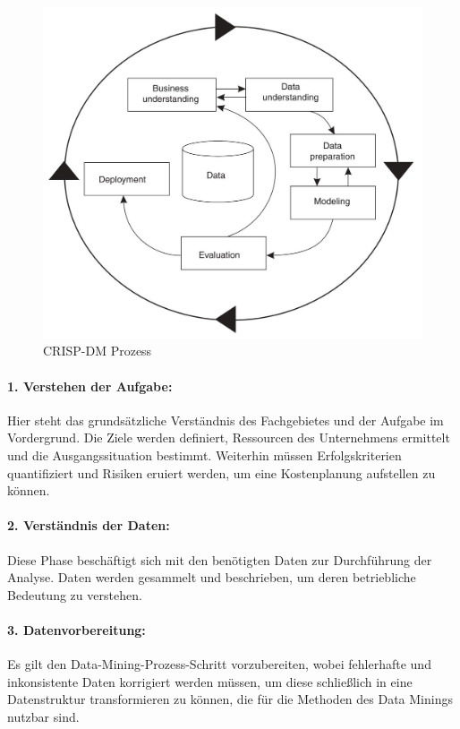 \begin{figure}[H]
\centering
\includegraphics[scale=0.7]{se-wa-jpg/crisp}
\caption[CRISP-DM Prozess]{CRISP-DM Prozess\protect\footnotemark}
\label{crisp}
\end{figure}


\paragraph{1. Verstehen der Aufgabe:}
Hier steht das grundsätzliche Verständnis des Fachgebietes und der Aufgabe im Vordergrund. Die Ziele werden definiert, Ressourcen des Unternehmens ermittelt und die Ausgangssituation bestimmt. Weiterhin müssen Erfolgskriterien quantifiziert und Risiken eruiert werden, um eine Kostenplanung aufstellen zu können. 
\paragraph{2. Verständnis der Daten:}
Diese Phase beschäftigt sich mit den benötigten Daten zur Durchführung der Analyse. Daten werden gesammelt und beschrieben, um deren betriebliche Bedeutung zu verstehen.
\paragraph{3. Datenvorbereitung:}
Es gilt den Data-Mining-Prozess-Schritt vorzubereiten, wobei fehlerhafte und inkonsistente Daten korrigiert werden müssen, um diese schließlich in eine Datenstruktur transformieren zu können, die für die Methoden des Data Minings nutzbar sind.
